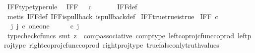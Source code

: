 \begin{isabellebody}
\isanewline
%
\endisadelimproof
\isanewline
{}\isamarkupfalse%
\ IFF{\isacharunderscore}{\kern0pt}type{\isacharbrackleft}{\kern0pt}type{\isacharunderscore}{\kern0pt}rule{\isacharbrackright}{\kern0pt}{\isacharcolon}{\kern0pt}\isanewline
\ \ {\isachardoublequoteopen}IFF\ {\isacharcolon}{\kern0pt}\ {\isasymOmega}\ {\isasymtimes}\isactrlsub c\ {\isasymOmega}\ {\isasymrightarrow}\ {\isasymOmega}{\isachardoublequoteclose}\isanewline
%
\isadelimproof
\ \ %
\endisadelimproof
%
\isatagproof
{}\isamarkupfalse%
\ IFF{\isacharunderscore}{\kern0pt}def\isanewline
\ \ \isamarkupfalse%
\ {\isacharparenleft}{\kern0pt}metis\ IFF{\isacharunderscore}{\kern0pt}def\ IFF{\isacharunderscore}{\kern0pt}is{\isacharunderscore}{\kern0pt}pullback\ is{\isacharunderscore}{\kern0pt}pullback{\isacharunderscore}{\kern0pt}def{\isacharparenright}{\kern0pt}%
\endisatagproof
{\isafoldproof}%
%
\isadelimproof
\isanewline
%
\endisadelimproof
\isanewline
{}\isamarkupfalse%
\ IFF{\isacharunderscore}{\kern0pt}true{\isacharunderscore}{\kern0pt}true{\isacharunderscore}{\kern0pt}is{\isacharunderscore}{\kern0pt}true{\isacharcolon}{\kern0pt}\isanewline
\ {\isachardoublequoteopen}IFF\ {\isasymcirc}\isactrlsub c\ {\isasymlangle}{\isasymt}{\isacharcomma}{\kern0pt}{\isasymt}{\isasymrangle}\ {\isacharequal}{\kern0pt}\ {\isasymt}{\isachardoublequoteclose}\isanewline
%
\isadelimproof
%
\endisadelimproof
%
\isatagproof
{}\isamarkupfalse%
\ {\isacharminus}{\kern0pt}\ \isanewline
\ \ \isamarkupfalse%
\ {\isachardoublequoteopen}{\isasymexists}\ j{\isachardot}{\kern0pt}\ j\ {\isasymin}\isactrlsub c\ {\isacharparenleft}{\kern0pt}one{\isasymCoprod}one{\isacharparenright}{\kern0pt}\ {\isasymand}\ {\isacharparenleft}{\kern0pt}{\isasymlangle}{\isasymt}{\isacharcomma}{\kern0pt}\ {\isasymt}{\isasymrangle}\ {\isasymamalg}{\isasymlangle}{\isasymf}{\isacharcomma}{\kern0pt}\ {\isasymf}{\isasymrangle}{\isacharparenright}{\kern0pt}\ {\isasymcirc}\isactrlsub c\ j\ \ {\isacharequal}{\kern0pt}\ {\isasymlangle}{\isasymt}{\isacharcomma}{\kern0pt}{\isasymt}{\isasymrangle}{\isachardoublequoteclose}\isanewline
\ \ \ \ \isamarkupfalse%
\ {\isacharparenleft}{\kern0pt}typecheck{\isacharunderscore}{\kern0pt}cfuncs{\isacharcomma}{\kern0pt}\ smt\ {\isacharparenleft}{\kern0pt}z{}{\isacharparenright}{\kern0pt}\ \ comp{\isacharunderscore}{\kern0pt}associative{}\ comp{\isacharunderscore}{\kern0pt}type\ left{\isacharunderscore}{\kern0pt}coproj{\isacharunderscore}{\kern0pt}cfunc{\isacharunderscore}{\kern0pt}coprod\ left{\isacharunderscore}{\kern0pt}proj{\isacharunderscore}{\kern0pt}type\ right{\isacharunderscore}{\kern0pt}coproj{\isacharunderscore}{\kern0pt}cfunc{\isacharunderscore}{\kern0pt}coprod\ right{\isacharunderscore}{\kern0pt}proj{\isacharunderscore}{\kern0pt}type\ true{\isacharunderscore}{\kern0pt}false{\isacharunderscore}{\kern0pt}only{\isacharunderscore}{\kern0pt}truth{\isacharunderscore}{\kern0pt}values{\isacharparenright}{\kern0pt}\isanewline

\end{isabellebody}
